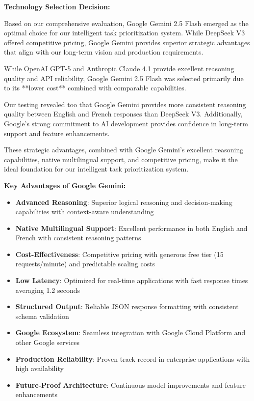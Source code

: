 \textbf{Technology Selection Decision:}

Based on our comprehensive evaluation, Google Gemini 2.5 Flash emerged as the optimal choice for our intelligent task prioritization system. While DeepSeek V3 offered competitive pricing, Google Gemini provides superior strategic advantages that align with our long-term vision and production requirements.

While OpenAI GPT-5 and Anthropic Claude 4.1 provide excellent reasoning quality and API reliability, Google Gemini 2.5 Flash was selected primarily due to its **lower cost** combined with comparable capabilities. 

Our testing revealed too that Google Gemini provides more consistent reasoning quality between English and French responses than DeepSeek V3. Additionally, Google's strong commitment to AI development provides confidence in long-term support and feature enhancements.

These strategic advantages, combined with Google Gemini's excellent reasoning capabilities, native multilingual support, and competitive pricing, make it the ideal foundation for our intelligent task prioritization system.

\textbf{Key Advantages of Google Gemini:}
\begin{itemize}
    \item \textbf{Advanced Reasoning}: Superior logical reasoning and decision-making capabilities with context-aware understanding
    \item \textbf{Native Multilingual Support}: Excellent performance in both English and French with consistent reasoning patterns
    \item \textbf{Cost-Effectiveness}: Competitive pricing with generous free tier (15 requests/minute) and predictable scaling costs
    \item \textbf{Low Latency}: Optimized for real-time applications with fast response times averaging 1.2 seconds
    \item \textbf{Structured Output}: Reliable JSON response formatting with consistent schema validation
    \item \textbf{Google Ecosystem}: Seamless integration with Google Cloud Platform and other Google services
    \item \textbf{Production Reliability}: Proven track record in enterprise applications with high availability
    \item \textbf{Future-Proof Architecture}: Continuous model improvements and feature enhancements
\end{itemize}

